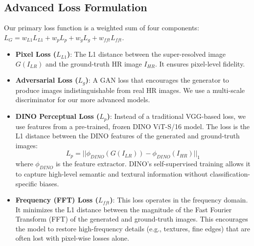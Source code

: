 \documentclass[10pt,twocolumn,letterpaper]{article}
\begin{document}
\subsection{Advanced Loss Formulation}
Our primary loss function is a weighted sum of four components: $L_{G} = w_{L1}L_{L1} + w_{p}L_{p} + w_{g}L_{g} + w_{fft}L_{fft}$.
\begin{itemize}
    \item \textbf{Pixel Loss ($L_{L1}$)}: The L1 distance between the super-resolved image $G(I_{LR})$ and the ground-truth HR image $I_{HR}$. It ensures pixel-level fidelity.
    \item \textbf{Adversarial Loss ($L_{g}$)}: A GAN loss that encourages the generator to produce images indistinguishable from real HR images. We use a multi-scale discriminator for our more advanced models.
    \item \textbf{DINO Perceptual Loss ($L_{p}$)}: Instead of a traditional VGG-based loss, we use features from a pre-trained, frozen DINO ViT-S/16 model. The loss is the L1 distance between the DINO features of the generated and ground-truth images:
    \begin{equation}
        L_{p} = ||\phi_{DINO}(G(I_{LR})) - \phi_{DINO}(I_{HR})||_1
    \end{equation}
    where $\phi_{DINO}$ is the feature extractor. DINO's self-supervised training allows it to capture high-level semantic and textural information without classification-specific biases.
    \item \textbf{Frequency (FFT) Loss ($L_{fft}$)}: This loss operates in the frequency domain. It minimizes the L1 distance between the magnitude of the Fast Fourier Transform (FFT) of the generated and ground-truth images. This encourages the model to restore high-frequency details (e.g., textures, fine edges) that are often lost with pixel-wise losses alone.
\end{itemize}
\end{document}
